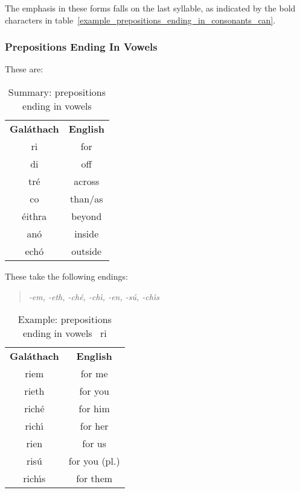 The emphasis in these forms falls on the last syllable, as indicated by the bold characters in table~\ref{example_prepositions_ending_in_consonants_can}.

\subsubsection{Prepositions Ending In Vowels}

These are:
\begin{table}[H]
\centering
\begin{tabular}{cc}
  \toprule
  \textbf{Gal\'{a}thach} & \textbf{English}\\
  \cmidrule(lr){1-1}\cmidrule(lr){2-2}
  ri & for\\
  di & off\\
  tr\'{e} & across\\
  co & than/as\\
  \'{e}ithra & beyond\\
  an\'{o} & inside\\
  ech\'{o} & outside\\
  \bottomrule
\end{tabular}
\caption{Summary: prepositions ending in vowels}
\label{summary_prepositions_ending_in_vowels}
\end{table}

These take the following endings:
\begin{quote}
\textit{-em, -eth, -ch\'{e}, -ch\'{\i}, -en, -s\'{u}, -ch\'{\i}s}
\end{quote}

\begin{table}[H]
\centering
\begin{tabular}{cc}
  \toprule
  \textbf{Gal\'{a}thach} & \textbf{English}\\
  \cmidrule(lr){1-1}\cmidrule(lr){2-2}
  riem & for me\\
  rieth & for you\\
  rich\'{e} & for him\\
  rich\'{\i} & for her\\
  rien & for us\\
  ris\'{u} & for you (pl.)\\
  rich\'{\i}s & for them\\
  \bottomrule
\end{tabular}
\caption{Example: prepositions ending in vowels \textendash\ ri}
\label{example_prepositions_ending_in_vowels_ri}
\end{table}

